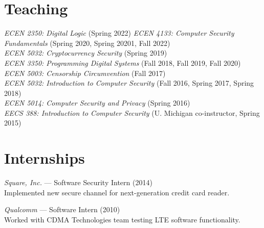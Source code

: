 \documentclass[margin,11pt]{res} %
\begin{document}
\vspace{6pt}
\section{\large Teaching}
    \emph{ECEN 2350: Digital Logic} (Spring 2022)
    \emph{ECEN 4133: Computer Security Fundamentals} (Spring 2020, Spring 20201, Fall 2022)\\
    \emph{ECEN 5032: Cryptocurrency Security} (Spring 2019)\\
    \emph{ECEN 3350: Programming Digital Systems} (Fall 2018, Fall 2019, Fall 2020)\\
    \emph{ECEN 5003: Censorship Circumvention} (Fall 2017)\\
    \emph{ECEN 5032: Introduction to Computer Security} (Fall 2016, Spring 2017, Spring 2018)\\
    \emph{ECEN 5014: Computer Security and Privacy} (Spring 2016)\\
    \emph{EECS 388: Introduction to Computer Security}  (U. Michigan co-instructor, Spring 2015)\\


\vspace{6pt}
\section{\large Internships}

    \emph{Square, Inc.} --- Software Security Intern (2014) \\
    Implemented new secure channel for next-generation credit card reader.
    
    \emph{Qualcomm} --- Software Intern (2010) \\
    Worked with CDMA Technologies team testing LTE software functionality.
    
\end{document}
